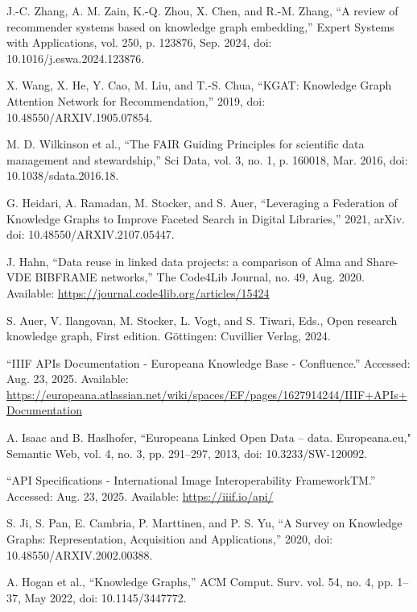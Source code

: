 \documentclass[12pt,a4paper]{article}
\begin{document}
\begin{thebibliography}{99}

 J.-C. Zhang, A. M. Zain, K.-Q. Zhou, X. Chen, and R.-M. Zhang, “A review of recommender systems based on knowledge graph embedding,” Expert Systems with Applications, vol. 250, p. 123876, Sep. 2024, doi: 10.1016/j.eswa.2024.123876.

 X. Wang, X. He, Y. Cao, M. Liu, and T.-S. Chua, “KGAT: Knowledge Graph Attention Network for Recommendation,” 2019, doi: 10.48550/ARXIV.1905.07854.

 M. D. Wilkinson et al., “The FAIR Guiding Principles for scientific data management and stewardship,” Sci Data, vol. 3, no. 1, p. 160018, Mar. 2016, doi: 10.1038/sdata.2016.18.

 G. Heidari, A. Ramadan, M. Stocker, and S. Auer, “Leveraging a Federation of Knowledge Graphs to Improve Faceted Search in Digital Libraries,” 2021, arXiv. doi: 10.48550/ARXIV.2107.05447.

 J. Hahn, “Data reuse in linked data projects: a comparison of Alma and Share-VDE BIBFRAME networks,” The Code4Lib Journal, no. 49, Aug. 2020. Available: \url{https://journal.code4lib.org/articles/15424}

 S. Auer, V. Ilangovan, M. Stocker, L. Vogt, and S. Tiwari, Eds., Open research knowledge graph, First edition. Göttingen: Cuvillier Verlag, 2024.

 “IIIF APIs Documentation - Europeana Knowledge Base - Confluence.” Accessed: Aug. 23, 2025. Available: \url{https://europeana.atlassian.net/wiki/spaces/EF/pages/1627914244/IIIF+APIs+Documentation}

 A. Isaac and B. Haslhofer, “Europeana Linked Open Data – data. Europeana.eu," Semantic Web, vol. 4, no. 3, pp. 291–297, 2013, doi: 10.3233/SW-120092.

 “API Specifications - International Image Interoperability FrameworkTM.” Accessed: Aug. 23, 2025. Available: \url{https://iiif.io/api/}

 S. Ji, S. Pan, E. Cambria, P. Marttinen, and P. S. Yu, “A Survey on Knowledge Graphs: Representation, Acquisition and Applications,” 2020, doi: 10.48550/ARXIV.2002.00388.

 A. Hogan et al., “Knowledge Graphs,” ACM Comput. Surv. vol. 54, no. 4, pp. 1–37, May 2022, doi: 10.1145/3447772.


\end{thebibliography}
\end{document}
